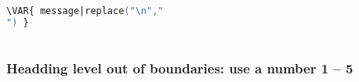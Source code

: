 
    \begin{lstlisting}[language=PostScript, caption=Error message]
            \VAR{ message|replace("\n","
") }
    \end{lstlisting}


\part{ }
\label{sec:\VAR{instance_uri}}
\chapter{  \textsuperscript{\normalsize {} } }
\label{sec:\VAR{instance_uri}}
\section{ \textsuperscript{\normalsize {} } }
\label{sec:\VAR{instance_uri}}
\subsection{ \textsuperscript{\normalsize {} } }
\label{sec:\VAR{instance_uri}}
\subsubsection{ \textsuperscript{\normalsize {} } }
\label{sec:\VAR{instance_uri}}
\section{Headding level out of boundaries: use a number 1 -- 5}

